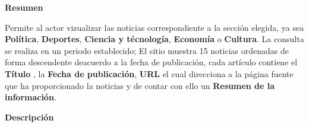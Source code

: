 

\begin{large}
	\textbf{Resumen}\\
\end{large}

Permite al actor vizualizar las noticias correspondiente a la sección elegida,
ya sea \textbf{Política}, \textbf{Deportes}, \textbf{Ciencia y técnología}, \textbf{Economía}
o \textbf{Cultura}. La consulta se realiza en un periodo establecido; El sitio muestra 15 
noticias ordenadas de forma descendente deacuerdo a la fecha de publicación, cada artículo 
contiene el \textbf{Título} , la \textbf{Fecha de publicación}, \textbf{URL} el cual direcciona a la página fuente que ha proporcionado la noticias y de contar con ello  un
\textbf{Resumen de la información}.\\

\begin{large}
	\textbf{Descripción}\\
\end{large}




